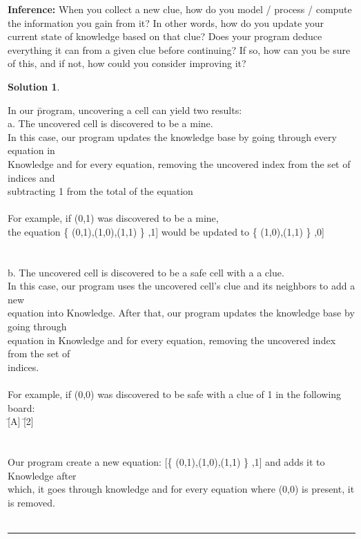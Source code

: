 \documentclass{article}
\theoremstyle{definition}
\def\fline{\rule{0.75\linewidth}{0.5pt}}
\newcommand{\finishline}{\vspace{-15pt}\begin{center}\fline\end{center}}
\newtheorem*{solution*}{Solution}
\newenvironment{solution}{\begin{solution*}}{{\finishline} \end{solution*}}
\begin{document}
\textbf{Inference:}
	When you collect a new clue, how do you model / process / compute the information you gain from it?
    In other words, how do you update your current state of knowledge based on that clue? 
    Does your program deduce everything it can from a given clue before continuing? If so, how can you be sure of this, and if not, how could you consider improving it? \\
\begin{solution} \hfill \\
    \begin{tabbing}
	In our \=program, uncovering a cell can yield two results: \\
	\>a. T\=he uncovered cell is discovered to be a mine.\\
	\>\>In this case, our program updates the knowledge base by going through every equation in\\ \>\>Knowledge and for every equation, removing the uncovered index from the set of indices and\\ \>\>subtracting 1 from the total of the equation\\\\
	
	\>\> For example, if (0,1) was discovered to be a mine, \\
	\>\>the equation \{ (0,1),(1,0),(1,1) \} ,1] would be updated to \{ (1,0),(1,1) \} ,0] \\\\\\
	
	\>b. The uncovered cell is discovered to be a safe cell with a a clue.\\
	\>\>In this case, our program uses the uncovered cell's clue and its neighbors to add a new\\ \>\>equation into Knowledge. After that, our program updates the knowledge base by going through\\
	\>\>equation in Knowledge and for every equation, removing the uncovered index from the set of\\
	\>\>indices.\\\\
	
	\>\>For example, if (0,0) was discovered to be safe with a clue of 1 in the following board:\\
	\>\>[1] \=[A] \=[2] \\ 
    \>\>[B] \>[C] \>[D] \\
    \>\>[E] \>[3] \>[F] \\
    \>\>Our program create a new equation: [\{ (0,1),(1,0),(1,1) \} ,1] and adds it to Knowledge after \\ \>\>which, it goes through knowledge and for every equation where (0,0) is present, it is removed.\\\\
    

\end{tabbing}
\end{solution}
\end{document}
